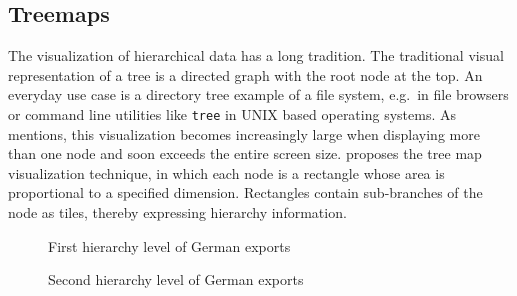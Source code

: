 \documentclass{article}
\begin{document}
\subsection{Treemaps}
The visualization of hierarchical data has a long tradition.
The traditional visual representation of a tree is a directed graph with the root node at the top.
An everyday use case is a directory tree example of a file system, e.g.\ in file browsers or command line utilities like \texttt{tree} in UNIX based operating systems.
As \textcite{Shneiderman1992} mentions, this visualization becomes increasingly large when displaying more than one node and soon exceeds the entire screen size.
\textcite{Johnson1991} proposes the tree map visualization technique, in which each node is a rectangle whose area is proportional to a specified dimension.
Rectangles contain sub-branches of the node as tiles, thereby expressing hierarchy information.
\begin{figure}[h]
    \centering
    \caption{First hierarchy level of German exports}\label{fig:theory:treemap-german-exports-1}
\end{figure}

\begin{figure}[h]
    \centering
    \caption{Second hierarchy level of German exports}\label{fig:theory:treemap-german-exports-2}
\end{figure}
\end{document}
